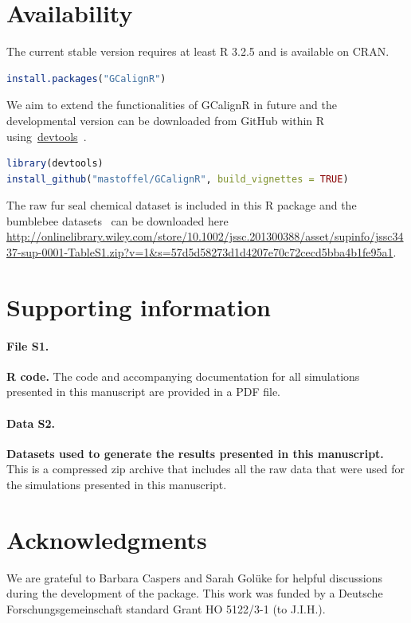 \documentclass[10pt,letterpaper]{article}
\begin{document}
\section*{Availability}
The current stable version requires at least R 3.2.5 and is available on CRAN.

\begin{lstlisting}[language=R]
install.packages("GCalignR")
\end{lstlisting}

We aim to extend the functionalities of GCalignR in future and the developmental version can be downloaded from GitHub within R using~\href{https://cran.r-project.org/web/packages/devtools/index.html}{devtools}~\cite{Wickham.2016}. 

\begin{lstlisting}[language=R]
library(devtools)
install_github("mastoffel/GCalignR", build_vignettes = TRUE)
\end{lstlisting}

The raw fur seal chemical dataset is included in this R package and the bumblebee datasets~\cite{Dellicour.2013} can be downloaded here \url{http://onlinelibrary.wiley.com/store/10.1002/jssc.201300388/asset/supinfo/jssc3437-sup-0001-TableS1.zip?v=1&s=57d5d58273d1d4207e70c72cecd5bba4b1fe95a1}.

\section*{Supporting information}

\paragraph*{File S1.}
\label{File S1}
{\bf R code.} The code and accompanying documentation for all simulations presented in this manuscript are provided in a PDF file.

\paragraph*{Data S2.}
\label{Data S2}
{\bf Datasets used to generate the results presented in this manuscript.} This is a compressed zip archive that includes all the raw data that were used for the simulations presented in this manuscript. 

\section*{Acknowledgments}
We are grateful to Barbara Caspers and Sarah Golüke for helpful discussions during the development of the package. This work was funded by a Deutsche Forschungsgemeinschaft standard Grant HO 5122/3-1 (to J.I.H.).
\end{document}
